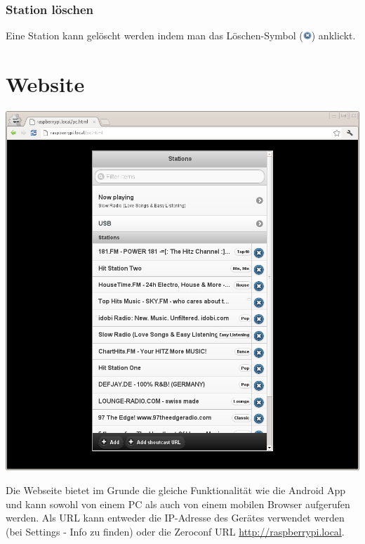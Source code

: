 \documentclass[12pt,a4paper,openany]{memoir}
\begin{document}
\subsubsection{Station löschen}
Eine Station kann gelöscht werden indem man das Löschen-Symbol (\includegraphics[width=12px]{images/delete.png}) anklickt. 

\section{Website}

\includegraphics[width=0.80\linewidth]{images/website.png}

Die Webseite bietet im Grunde die gleiche Funktionalität wie die Android App und kann sowohl von einem PC als auch von einem mobilen Browser aufgerufen werden. 
Als URL kann entweder die IP-Adresse des Gerätes verwendet werden (bei Settings - Info zu finden) oder die Zeroconf URL \url{http://raspberrypi.local}.
\end{document}
